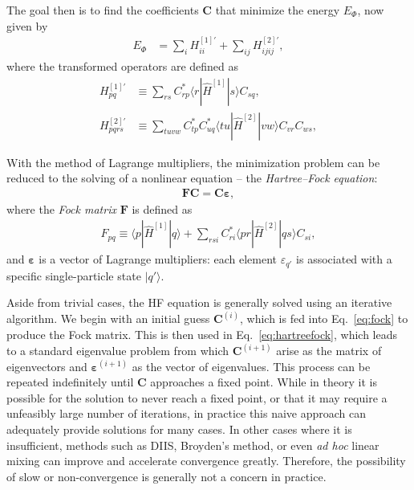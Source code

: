 The goal then is to find the coefficients $\bm C$ that minimize the energy $E_{\Phi}$, now given by
\begin{align}
  E_{\Phi} &= \sum_i H^{[1] \prime}_{i i} + \sum_{i j} H^{[2] \prime}_{i j i j} \label{eq:hfenergy},
\end{align}
where the transformed operators are defined as
\begin{align}
  H^{[1] \prime}_{p q} &\equiv \sum_{r s} C_{r p}^* \langle r | \hat{H}^{[1]} | s \rangle C_{s q}^{}, \label{eq:hftransform1} \\
  H^{[2] \prime}_{p q r s} &\equiv \sum_{t u v w} C_{t p}^* C_{u q}^* \langle t u | \hat{H}^{[2]} | v w \rangle C_{v r}^{} C_{w s}^{}, \label{eq:hftransform2}
\end{align}

With the method of Lagrange multipliers, the minimization problem can be reduced to the solving of a nonlinear equation -- the \textit{Hartree--Fock equation}:
\begin{align} \label{eq:hartreefock}
  \bm{F} \bm{C} = \bm{C} \bm{\varepsilon},
\end{align}
where the \textit{Fock matrix} $\bm F$ is defined as
\begin{align} \label{eq:fock}
  F_{p q} \equiv \langle p | \hat{H}^{[1]} | q \rangle + \sum_{r s i} C_{r i}^* \langle p r | \hat{H}^{[2]} | q s \rangle C_{s i}^{},
\end{align}
and $\bm{\varepsilon}$ is a vector of Lagrange multipliers: each element $\varepsilon_{q'}$ is associated with a specific single-particle state $|q'\rangle$.

Aside from trivial cases, the HF equation is generally solved using an iterative algorithm.  We begin with an initial guess $\bm{C}^{(i)}$, which is fed into Eq.\ \eqref{eq:fock} to produce the Fock matrix.  This is then used in Eq.\ \eqref{eq:hartreefock}, which leads to a standard eigenvalue problem from which $\bm{C}^{(i + 1)}$ arise as the matrix of eigenvectors and $\bm{\varepsilon}^{(i + 1)}$ as the vector of eigenvalues.  This process can be repeated indefinitely until $\bm{C}$ approaches a fixed point.  While in theory it is possible for the solution to never reach a fixed point, or that it may require a unfeasibly large number of iterations, in practice this naive approach can adequately provide solutions for many cases.  In other cases where it is insufficient, methods such as DIIS, Broyden's method, or even \textit{ad hoc} linear mixing can improve and accelerate convergence greatly.  Therefore, the possibility of slow or non-convergence is generally not a concern in practice.


